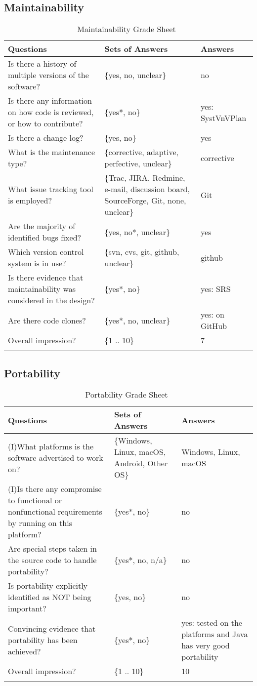 \documentclass[12pt, titlepage]{article}
\begin{document}
\subsection{Maintainability}
\label{sec_Maintainability}

\begin{longtable}{p{7cm} p{4cm} l}
\hline Questions & Sets of Answers & Answers \\ \hline
Is there a history of multiple versions of the software? & \{yes, no, unclear\}
& no\\
Is there any information on how code is reviewed, or how to contribute? &
\{yes*, no\} & yes: SystVnVPlan \cite{Dong2019SystVnV}\\
Is there a change log? & \{yes, no\} & yes\\
What is the maintenance type? & \{corrective, adaptive, perfective, unclear\}&
corrective\\
What issue tracking tool is employed? & \{Trac, JIRA, Redmine, e-mail,
discussion board, SourceForge, Git, none, unclear\}& Git\\
Are the majority of identified bugs fixed? & \{yes, no*, unclear\} & yes\\
Which version control system is in use? & \{svn, cvs, git, github, unclear\} &
github\\
Is there evidence that maintainability was considered in the design? & \{yes*,
no\} & yes: SRS \cite{Dong2019SRS}\\
Are there code clones? & \{yes*, no, unclear\} & yes: on GitHub \\
Overall impression? & \{1 .. 10\} & 7\\ \hline
\caption{Maintainability Grade Sheet~\cite{SmithEtAl2018}}
\label{Tb_maintainability}
\end{longtable}

\subsection{Portability}
\label{sec_Portability}

\begin{longtable}{p{7cm} p{4cm} p{4cm}}
\toprule
Questions & Sets of Answers & Answers\\ \midrule

(I)What platforms is the software advertised to work on?
& \{Windows, Linux, macOS, Android, Other
OS\} & Windows, Linux, macOS\\
(I)Is there any compromise to functional or nonfunctional requirements by
running on this platform? &
\{yes*, no\} & no\\Are special steps taken in the source code to handle
portability?& \{yes*, no,
n/a\} & no\\
Is portability explicitly identified as NOT being important? & \{yes, no\} &
no\\
Convincing evidence that portability has been achieved? & \{yes*, no\} & yes:
tested on the platforms and Java has very good portability\\
Overall impression? & \{1 .. 10\} & 10\\ \bottomrule
\caption{Portability Grade Sheet~\cite{SmithEtAl2018}}
\label{Tb_portability}
\end{longtable}
\end{document}
